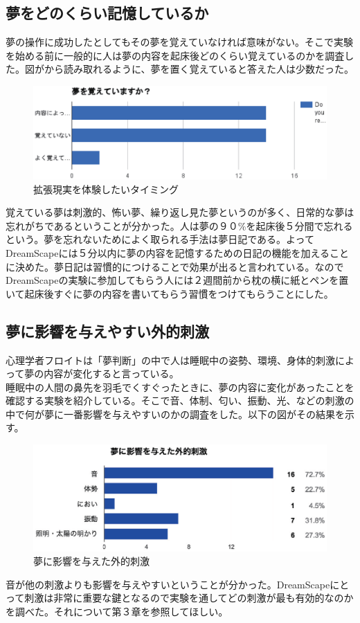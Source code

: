 \subsection{夢をどのくらい記憶しているか}
夢の操作に成功したとしてもその夢を覚えていなければ意味がない。そこで実験を始める前に一般的に人は夢の内容を起床後どのくらい覚えているのかを調査した。図がから読み取れるように、夢を置く覚えていると答えた人は少数だった。
\begin{figure}[htbp]
\begin{center}
\includegraphics[width=15cm]{eps/remember.eps}
\caption{拡張現実を体験したいタイミング}
\label{拡張現実を体験したいタイミング}
\end{center}
\end{figure}
覚えている夢は刺激的、怖い夢、繰り返し見た夢というのが多く、日常的な夢は忘れがちであるということが分かった。人は夢の９０\%を起床後５分間で忘れるという。夢を忘れないためによく取られる手法は夢日記である。よってDreamScapeには５分以内に夢の内容を記憶するための日記の機能を加えることに決めた。夢日記は習慣的につけることで効果が出ると言われている。なのでDreamScapeの実験に参加してもらう人には２週間前から枕の横に紙とペンを置いて起床後すぐに夢の内容を書いてもらう習慣をつけてもらうことにした。

\subsection{夢に影響を与えやすい外的刺激}
心理学者フロイトは「夢判断」の中で人は睡眠中の姿勢、環境、身体的刺激によって夢の内容が変化すると言っている\cite{freud}。\\
睡眠中の人間の鼻先を羽毛でくすぐったときに、夢の内容に変化があったことを確認する実験を紹介している。そこで音、体制、匂い、振動、光、などの刺激の中で何が夢に一番影響を与えやすいのかの調査をした。以下の図がその結果を示す。
\begin{figure}[htbp]
\begin{center}
\includegraphics[width=15cm]{eps/input.eps}
\caption{夢に影響を与えた外的刺激}
\label{夢に影響を与えた外的刺激}
\end{center}
\end{figure}
音が他の刺激よりも影響を与えやすいということが分かった。DreamScapeにとって刺激は非常に重要な鍵となるので実験を通してどの刺激が最も有効的なのかを調べた。それについて第３章を参照してほしい。

